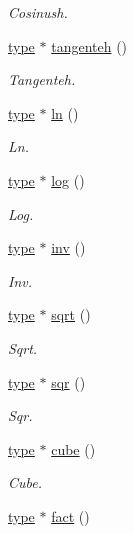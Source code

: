 \begin{DoxyCompactItemize}
\begin{DoxyCompactList}\small\item\em Cosinush. \end{DoxyCompactList}\item 
\hyperlink{classtype}{type} $\ast$ \hyperlink{classcomplexe_a3e8cf2a1498e563d89b4039c0dc1eceb}{tangenteh} ()
\begin{DoxyCompactList}\small\item\em Tangenteh. \end{DoxyCompactList}\item 
\hyperlink{classtype}{type} $\ast$ \hyperlink{classcomplexe_a07d473394f16fb1dcfc4770393d165fb}{ln} ()
\begin{DoxyCompactList}\small\item\em Ln. \end{DoxyCompactList}\item 
\hyperlink{classtype}{type} $\ast$ \hyperlink{classcomplexe_aa2de62452b049622ad898ac9cc271403}{log} ()
\begin{DoxyCompactList}\small\item\em Log. \end{DoxyCompactList}\item 
\hyperlink{classtype}{type} $\ast$ \hyperlink{classcomplexe_af18ddceaaa21ffc73c5de98d5a037624}{inv} ()
\begin{DoxyCompactList}\small\item\em Inv. \end{DoxyCompactList}\item 
\hyperlink{classtype}{type} $\ast$ \hyperlink{classcomplexe_a9d26ee640673118afe49f29cb98f3258}{sqrt} ()
\begin{DoxyCompactList}\small\item\em Sqrt. \end{DoxyCompactList}\item 
\hyperlink{classtype}{type} $\ast$ \hyperlink{classcomplexe_a3274db71725cb6d6291939a66ebc3d64}{sqr} ()
\begin{DoxyCompactList}\small\item\em Sqr. \end{DoxyCompactList}\item 
\hyperlink{classtype}{type} $\ast$ \hyperlink{classcomplexe_a8d31faea698bef636ff85d5dfd2868ae}{cube} ()
\begin{DoxyCompactList}\small\item\em Cube. \end{DoxyCompactList}\item 
\hyperlink{classtype}{type} $\ast$ \hyperlink{classcomplexe_a9fbe1031ebd0226e4bb1c64cbc67b605}{fact} ()

\end{DoxyCompactItemize}
